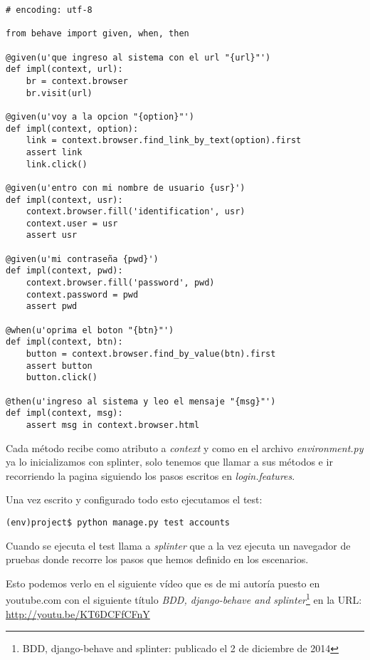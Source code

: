 \begin{verbatim}
# encoding: utf-8

from behave import given, when, then

@given(u'que ingreso al sistema con el url "{url}"')
def impl(context, url):
    br = context.browser
    br.visit(url)

@given(u'voy a la opcion "{option}"')
def impl(context, option):
    link = context.browser.find_link_by_text(option).first
    assert link
    link.click()

@given(u'entro con mi nombre de usuario {usr}')
def impl(context, usr):
    context.browser.fill('identification', usr)
    context.user = usr
    assert usr

@given(u'mi contraseña {pwd}')
def impl(context, pwd):
    context.browser.fill('password', pwd)
    context.password = pwd
    assert pwd

@when(u'oprima el boton "{btn}"')
def impl(context, btn):
    button = context.browser.find_by_value(btn).first
    assert button
    button.click()

@then(u'ingreso al sistema y leo el mensaje "{msg}"')
def impl(context, msg):
    assert msg in context.browser.html
\end{verbatim}

Cada método recibe como atributo a {\it context} y como en el archivo
{\it environment.py} ya lo inicializamos con splinter, solo tenemos que llamar
a sus métodos e ir recorriendo la pagina siguiendo los pasos escritos
en {\it login.features}.

Una vez escrito y configurado todo esto ejecutamos el test:

\begin{verbatim}
(env)project$ python manage.py test accounts
\end{verbatim}

Cuando se ejecuta el test llama a {\it splinter} que a la vez ejecuta un navegador
de pruebas donde recorre los pasos que hemos definido en los escenarios.

Esto podemos verlo en el siguiente vídeo que es de mi autoría puesto en youtube.com
con el siguiente título {\it BDD, django-behave and splinter}\footnote{BDD,
django-behave and splinter: publicado el 2 de diciembre de 2014} en la URL: \url{http://youtu.be/KT6DCFfCFnY}

